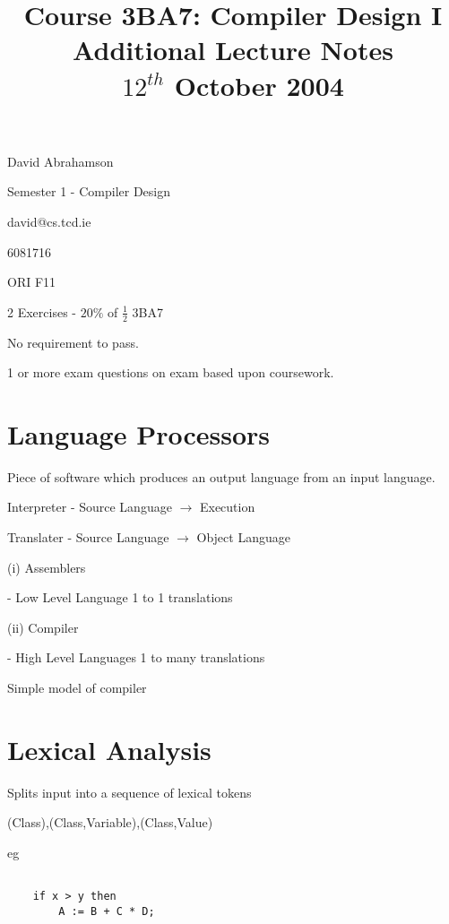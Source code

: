 \documentclass[a4paper,12pt]{article}
\begin{document}
\title{Course 3BA7: Compiler Design I \\ Additional Lecture Notes \\ $12^{th}$ October 2004}

\maketitle

David Abrahamson

Semester 1 - Compiler Design

david@cs.tcd.ie

6081716

ORI F11

2 Exercises - $20\%$ of $\frac{1}{2}$ 3BA7

No requirement to pass.

1 or more exam questions on exam based upon coursework.


\section{Language Processors}

Piece of software which produces an output language from an input
language.


Interpreter - Source Language $\to$ Execution

Translater -  Source Language $\to$ Object Language

(i) Assemblers
	
	- Low Level Language
	  1 to 1 translations

(ii) Compiler
	
	- High Level Languages
	  1 to many translations



Simple model of compiler

\section{Lexical Analysis}

Splits input into a sequence of lexical tokens

(Class),(Class,Variable),(Class,Value)


eg

\begin{verbatim}

	if x > y then
		A := B + C * D;

\end{verbatim}
\end{document}
